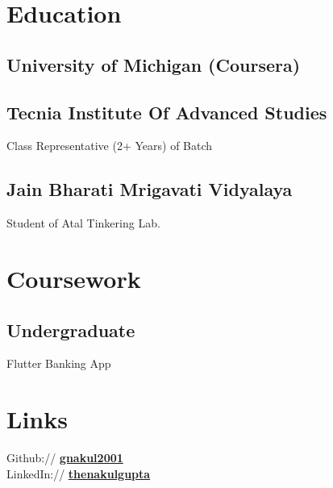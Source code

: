 \documentclass[]{deedy-resume-openfont}
\begin{document}
\begin{minipage}[t]{0.4\textwidth}
\section{Education} 

\subsection{University of Michigan (Coursera)}
\sectionsep

\subsection{Tecnia Institute Of Advanced Studies}
Class Representative (2+ Years) of Batch
\sectionsep

\subsection{Jain Bharati Mrigavati Vidyalaya}
Student of Atal Tinkering Lab.
\sectionsep



\section{Coursework}

\subsection{Undergraduate}
Flutter Banking App\\

\vspace{\topsep} %
\section{Links} 
Github:// \href{https://github.com/gnakul2001}{\bf gnakul2001} \\
LinkedIn://  \href{https://www.linkedin.com/in/thenakulgupta}{\bf thenakulgupta} \\
\sectionsep

%
%

\end{minipage} 
\end{document}
